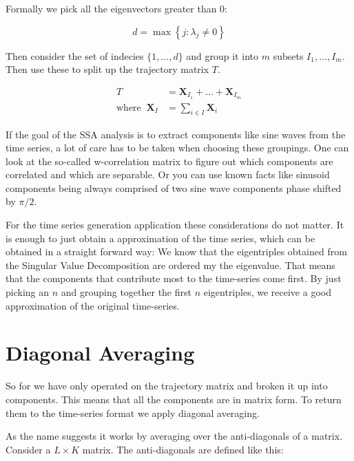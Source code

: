 Formally we pick all the eigenvectors greater than 0:

\begin{equation}
  d=\max \left\{j: \lambda_{j} \neq 0\right\} 
\end{equation}

Then consider the set of indecies $\{1, \ldots, d\}$ and group it into $m$ subsets $I_1, \ldots, I_m$. Then use these to split up the trajectory matrix $T$. 

\begin{equation}
   \begin{aligned}
      T&=\mathbf{X}_{I_{1}}+\ldots+\mathbf{X}_{I_{m}} \\
      \text{where} \;\; \mathbf{X}_{I}&=\sum_{i \in I} \mathbf{X}_{i}
   \end{aligned}
\end{equation}
  
If the goal of the SSA analysis is to extract components like sine waves from the time series, a lot of care has to be taken when choosing these groupings. One can look at the so-called w-correlation matrix to figure out which components are correlated and which are separable. Or you can use known facts like sinusoid components being always comprised of two sine wave components phase shifted by $\pi/2$. 

For the time series generation application these considerations do not matter. It is enough to just obtain a approximation of the time series, which can be obtained in a straight forward way: We know that the eigentriples obtained from the Singular Value Decomposition are ordered my the eigenvalue. That means that the components that contribute most to the time-series come first. By just picking an $n$ and grouping together the first $n$ eigentriples, we receive a good approximation of the original time-series.  \parencite{golyandina2014basic}

\section{Diagonal Averaging}

So for we have only operated on the trajectory matrix and broken it up into components. This means that all the components are in matrix form. To return them to the time-series format we apply diagonal averaging. 

As the name suggests it works by averaging over the anti-diagonals of a matrix. Consider a $L\times K$ matrix. The anti-diagonals are defined like this: 

